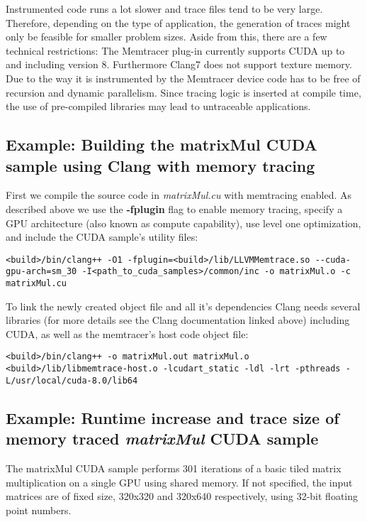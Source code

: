 \documentclass{scrartcl}
\begin{document}
Instrumented code runs a lot slower and trace files tend to be very large. Therefore, depending on the type of application, the generation of traces might only be feasible for smaller problem sizes.
Aside from this, there are a few technical restrictions:
The Memtracer plug-in currently supports CUDA up to and including version 8. Furthermore Clang7 does not support texture memory.
Due to the way it is instrumented by the Memtracer device code has to be free of recursion and dynamic parallelism.
Since tracing logic is inserted at compile time, the use of pre-compiled libraries may lead to untraceable applications.


\subsection{Example: Building the matrixMul CUDA sample using Clang with memory tracing}

First we compile the source code in \textit{matrixMul.cu} with memtracing enabled.
As described above we use the \textbf{-fplugin} flag to enable memory tracing, specify a GPU architecture (also known as compute capability), use level one optimization, and include the CUDA sample’s utility files:
\begin{lstlisting}
<build>/bin/clang++ -O1 -fplugin=<build>/lib/LLVMMemtrace.so --cuda-gpu-arch=sm_30 -I<path_to_cuda_samples>/common/inc -o matrixMul.o -c matrixMul.cu
\end{lstlisting}


To link the newly created object file and all it’s dependencies Clang needs several libraries (for more details see the Clang documentation linked above) including CUDA, as well as the memtracer’s host code object file:

\begin{lstlisting}
<build>/bin/clang++ -o matrixMul.out matrixMul.o <build>/lib/libmemtrace-host.o -lcudart_static -ldl -lrt -pthreads -L/usr/local/cuda-8.0/lib64
\end{lstlisting}


\subsection{Example: Runtime increase and trace size of memory traced \textit{matrixMul} CUDA sample}

The matrixMul CUDA sample performs 301 iterations of a basic tiled matrix multiplication on a single GPU using shared memory. If not specified, the input matrices are of fixed size, 320x320 and 320x640 respectively, using 32-bit floating point numbers.
\end{document}
